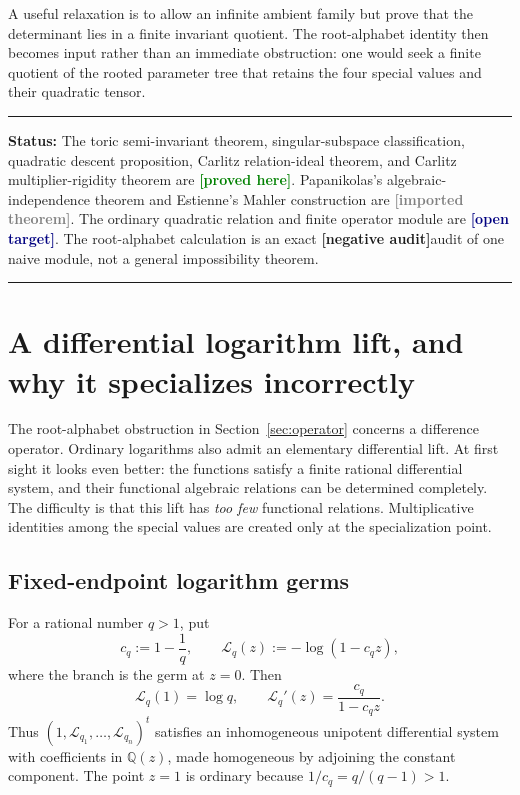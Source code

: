 \documentclass[11pt,oneside]{article}
\theoremstyle{definition}
\theoremstyle{remark}
\newcommand{\Q}{\mathbb Q}
\newcommand{\cL}{\mathcal L}
\newcommand{\statusproved}{\textcolor{green}{\textbf{[proved here]}}}
\newcommand{\statusimported}{\textcolor{gray}{\textbf{[imported theorem]}}}
\newcommand{\statustarget}{\textcolor{navy}{\textbf{[open target]}}}
\newcommand{\statusnegative}{\textcolor{brick}{\textbf{[negative audit]}}}
\newenvironment{statusbox}[1]
{\begin{center}\begin{minipage}{0.95\textwidth}\raggedright\hrule
\vspace{0.45em}\textbf{Status:} #1\par\vspace{0.35em}}
{\vspace{0.35em}\hrule\end{minipage}\end{center}}
\begin{document}
A useful relaxation is to allow an infinite ambient family but prove that the determinant lies in a
finite invariant quotient.  The root-alphabet identity then becomes input rather than an immediate
obstruction: one would seek a finite quotient of the rooted parameter tree that retains the four
special values and their quadratic tensor.

\begin{statusbox}{The toric semi-invariant theorem, singular-subspace classification, quadratic
descent proposition, Carlitz relation-ideal theorem, and Carlitz multiplier-rigidity theorem are
\statusproved.  Papanikolas's algebraic-independence theorem and Estienne's Mahler construction are
\statusimported.  The ordinary quadratic relation and finite operator module are
\statustarget.  The root-alphabet calculation is an exact \statusnegative audit of one naive
module, not a general impossibility theorem.}
\end{statusbox}

\section{A differential logarithm lift, and why it specializes incorrectly}
\label{sec:differential-audit}

The root-alphabet obstruction in Section~\ref{sec:operator} concerns a difference
operator.  Ordinary logarithms also admit an elementary differential lift.  At first sight it
looks even better: the functions satisfy a finite rational differential system, and their
functional algebraic relations can be determined completely.  The difficulty is that this lift
has \emph{too few} functional relations.  Multiplicative identities among the special values are
created only at the specialization point.

\subsection{Fixed-endpoint logarithm germs}

For a rational number $q>1$, put
\begin{equation}
  c_q:=1-\frac1q,
  \qquad
  \cL_q(z):=-\log(1-c_qz),
  \label{eq:differential-log-family}
\end{equation}
where the branch is the germ at $z=0$.  Then
\begin{equation}
  \cL_q(1)=\log q,
  \qquad
  \cL_q'(z)=\frac{c_q}{1-c_qz}.
  \label{eq:differential-log-values}
\end{equation}
Thus $(1,\cL_{q_1},\ldots,\cL_{q_n})^t$ satisfies an inhomogeneous unipotent differential
system with coefficients in $\Q(z)$, made homogeneous by adjoining the constant component.
The point $z=1$ is ordinary because $1/c_q=q/(q-1)>1$.
\end{document}
